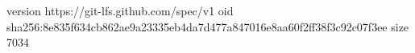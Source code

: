 version https://git-lfs.github.com/spec/v1
oid sha256:8e835f634cb862ae9a23335eb4da7d477a847016e8aa60f2ff38f3c92c07f3ee
size 7034
